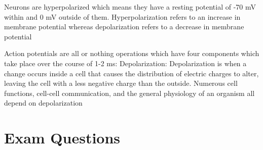 \documentclass{article}
\begin{document}
\noindent Neurons are hyperpolarized which means they have a resting potential of -70 mV within and 0 mV outside of them. Hyperpolarization refers to an increase in membrane potential whereas depolarization refers to a decrease in membrane potential

\noindent Action potentials are all or nothing operations which have four components which take place over the course of 1-2 ms:
Depolarization: Depolarization is when a change occurs inside a cell that causes the distribution of electric charges to alter, leaving the cell with a less negative charge than the outside. Numerous cell functions, cell-cell communication, and the general physiology of an organism all depend on depolarization

\section*{Exam Questions}
\end{document}
